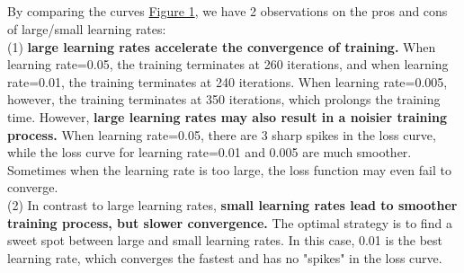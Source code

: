 \documentclass{article}
\begin{document}
        \subsection{}
        By comparing the curves \hyperref[fig:1.2]{Figure 1}, we have 2 observations on the pros and cons of large/small learning rates:\\
        (1) \textbf{large learning rates accelerate the convergence of training.} 
        When learning rate=0.05, the training terminates at 260 iterations, and when learning rate=0.01, the training terminates at 240 iterations.
        When learning rate=0.005, however, the training terminates at 350 iterations, which prolongs the training time.
        However, \textbf{large learning rates may also result in a noisier training process.} 
        When learning rate=0.05, there are 3 sharp spikes in the loss curve, while the loss curve for learning rate=0.01 and 0.005 are much smoother. 
        Sometimes when the learning rate is too large, the loss function may even fail to converge. \\
        (2) In contrast to large learning rates, \textbf{small learning rates lead to smoother training process, but slower convergence.}
        The optimal strategy is to find a sweet spot between large and small learning rates.
        In this case, 0.01 is the best learning rate, which converges the fastest and has no "spikes" in the loss curve.
\end{document}
